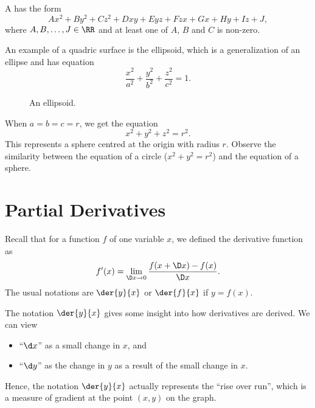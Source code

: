 \begin{definition}
    A  has the form \[Ax^2 + By^2 + Cz^2 + Dxy + Eyz + Fzx + Gx + Hy + Iz + J,\] where $A, B, \dots, J \in \RR$ and at least one of $A$, $B$ and $C$ is non-zero.
\end{definition}

An example of a quadric surface is the ellipsoid, which is a generalization of an ellipse and has equation \[\frac{x^2}{a^2} + \frac{y^2}{b^2} + \frac{z^2}{c^2} = 1.\]

\begin{figure}[H]
    \centering
    \caption{An ellipsoid.}
\end{figure}

When $a = b = c = r$, we get the equation \[x^2 + y^2 + z^2 = r^2.\] This represents a sphere centred at the origin with radius $r$. Observe the similarity between the equation of a circle ($x^2 + y^2 = r^2$) and the equation of a sphere.

\section{Partial Derivatives}

Recall that for a function $f$ of one variable $x$, we defined the derivative function as \[f'(x) = \lim_{\D x \to 0} \frac{f(x + \D x) - f(x)}{\D x}.\] The usual notations are $\der{y}{x}$ or $\der{f}{x}$ if $y = f(x)$.

The notation $\der{y}{x}$ gives some insight into how derivatives are derived. We can view
\begin{itemize}
    \item ``$\d x$'' as a small change in $x$, and
    \item ``$\d y$'' as the change in $y$ as a result of the small change in $x$.
\end{itemize}
Hence, the notation $\der{y}{x}$ actually represents the ``rise over run'', which is a measure of gradient at the point $(x, y)$ on the graph.

